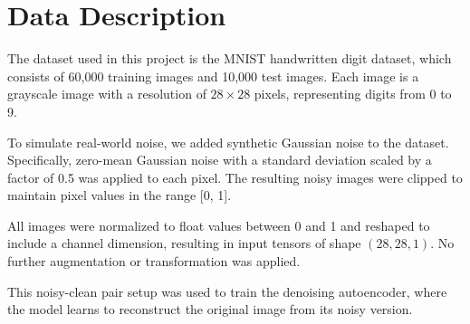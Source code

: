 \section{Data Description}

The dataset used in this project is the MNIST handwritten digit dataset, which consists of 60,000 training images and 10,000 test images. Each image is a grayscale image with a resolution of $28 \times 28$ pixels, representing digits from 0 to 9.

To simulate real-world noise, we added synthetic Gaussian noise to the dataset. Specifically, zero-mean Gaussian noise with a standard deviation scaled by a factor of 0.5 was applied to each pixel. The resulting noisy images were clipped to maintain pixel values in the range [0, 1].

All images were normalized to float values between 0 and 1 and reshaped to include a channel dimension, resulting in input tensors of shape $(28, 28, 1)$. No further augmentation or transformation was applied.

This noisy-clean pair setup was used to train the denoising autoencoder, where the model learns to reconstruct the original image from its noisy version.